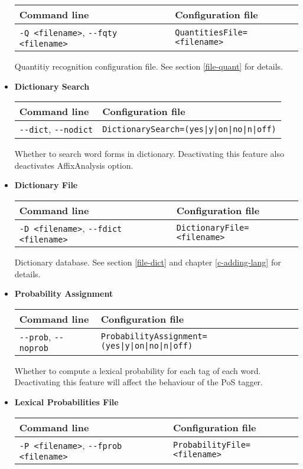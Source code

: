 \documentclass[a4paper]{book}
\begin{document}
\begin{itemize}
\begin{tabular}{|l|l|}
Command line       & Configuration file   \\ \hline
\verb#-Q <filename>#, \verb#--fqty <filename>#  & \verb#QuantitiesFile=<filename>#  \\ \hline
\end{tabular}

 Quantitiy recognition configuration file. See section
 \ref{file-quant} for details.

\item {\bf Dictionary Search}

\begin{tabular}{|l|l|}
Command line       & Configuration file   \\ \hline
\verb#--dict#, \verb#--nodict#    & \verb#DictionarySearch=(yes|y|on|no|n|off)#    \\ \hline
\end{tabular}

 Whether to search word forms in dictionary. Deactivating this feature
 also deactivates AffixAnalysis option.

\item {\bf Dictionary File}

\begin{tabular}{|l|l|}
Command line       & Configuration file   \\ \hline
\verb#-D <filename>#, \verb#--fdict <filename># & \verb#DictionaryFile=<filename>#  \\ \hline
\end{tabular}

 Dictionary database. 
 See section \ref{file-dict} and chapter \ref{c-adding-lang} for details.

\item {\bf Probability Assignment}

\begin{tabular}{|l|l|}
Command line       & Configuration file   \\ \hline
\verb#--prob#, \verb#--noprob#    & \verb#ProbabilityAssignment=(yes|y|on|no|n|off)#  \\ \hline
\end{tabular}

 Whether to compute a lexical probability for each tag of each word. 
 Deactivating this feature will affect the behaviour of the PoS tagger.

\item {\bf Lexical Probabilities File}

\begin{tabular}{|l|l|}
Command line       & Configuration file   \\ \hline
\verb#-P <filename>#, \verb#--fprob <filename># & \verb#ProbabilityFile=<filename># \\ \hline
\end{tabular}


\end{itemize}
\end{document}
